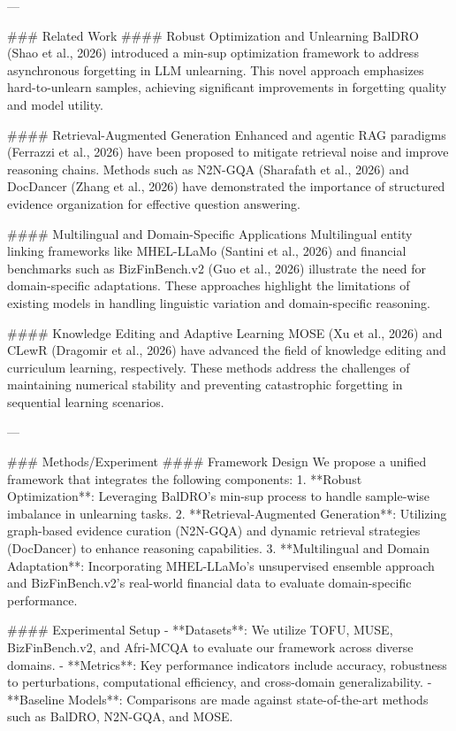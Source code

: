 ---

### Related Work
#### Robust Optimization and Unlearning
BalDRO (Shao et al., 2026) introduced a min-sup optimization framework to address asynchronous forgetting in LLM unlearning. This novel approach emphasizes hard-to-unlearn samples, achieving significant improvements in forgetting quality and model utility.

#### Retrieval-Augmented Generation
Enhanced and agentic RAG paradigms (Ferrazzi et al., 2026) have been proposed to mitigate retrieval noise and improve reasoning chains. Methods such as N2N-GQA (Sharafath et al., 2026) and DocDancer (Zhang et al., 2026) have demonstrated the importance of structured evidence organization for effective question answering.

#### Multilingual and Domain-Specific Applications
Multilingual entity linking frameworks like MHEL-LLaMo (Santini et al., 2026) and financial benchmarks such as BizFinBench.v2 (Guo et al., 2026) illustrate the need for domain-specific adaptations. These approaches highlight the limitations of existing models in handling linguistic variation and domain-specific reasoning.

#### Knowledge Editing and Adaptive Learning
MOSE (Xu et al., 2026) and CLewR (Dragomir et al., 2026) have advanced the field of knowledge editing and curriculum learning, respectively. These methods address the challenges of maintaining numerical stability and preventing catastrophic forgetting in sequential learning scenarios.

---

### Methods/Experiment
#### Framework Design
We propose a unified framework that integrates the following components:
1. **Robust Optimization**: Leveraging BalDRO's min-sup process to handle sample-wise imbalance in unlearning tasks.
2. **Retrieval-Augmented Generation**: Utilizing graph-based evidence curation (N2N-GQA) and dynamic retrieval strategies (DocDancer) to enhance reasoning capabilities.
3. **Multilingual and Domain Adaptation**: Incorporating MHEL-LLaMo's unsupervised ensemble approach and BizFinBench.v2's real-world financial data to evaluate domain-specific performance.

#### Experimental Setup
- **Datasets**: We utilize TOFU, MUSE, BizFinBench.v2, and Afri-MCQA to evaluate our framework across diverse domains.
- **Metrics**: Key performance indicators include accuracy, robustness to perturbations, computational efficiency, and cross-domain generalizability.
- **Baseline Models**: Comparisons are made against state-of-the-art methods such as BalDRO, N2N-GQA, and MOSE.

